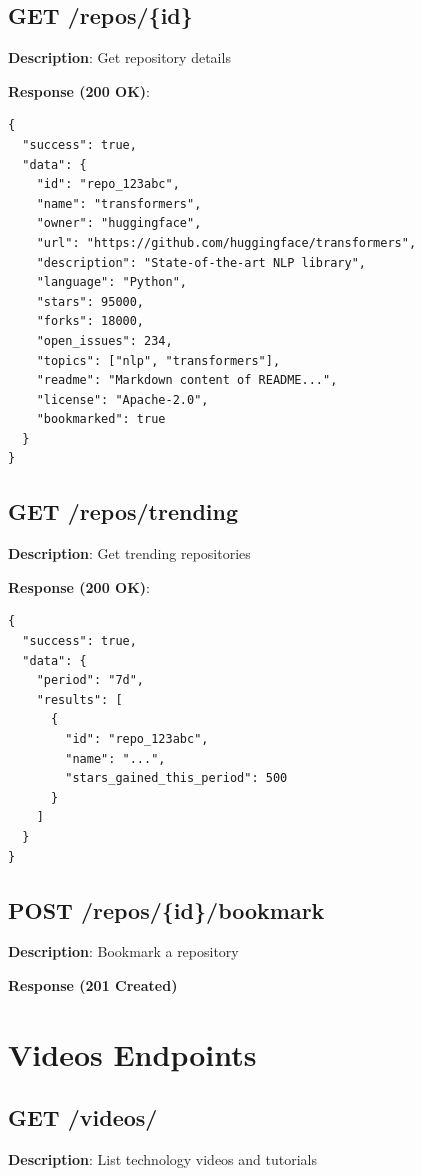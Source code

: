 \documentclass[12pt,a4paper]{report}
\begin{document}
\section{GET /repos/\{id\}}

\textbf{Description}: Get repository details

\textbf{Response (200 OK)}:
\begin{lstlisting}
{
  "success": true,
  "data": {
    "id": "repo_123abc",
    "name": "transformers",
    "owner": "huggingface",
    "url": "https://github.com/huggingface/transformers",
    "description": "State-of-the-art NLP library",
    "language": "Python",
    "stars": 95000,
    "forks": 18000,
    "open_issues": 234,
    "topics": ["nlp", "transformers"],
    "readme": "Markdown content of README...",
    "license": "Apache-2.0",
    "bookmarked": true
  }
}
\end{lstlisting}

\section{GET /repos/trending}

\textbf{Description}: Get trending repositories

\textbf{Response (200 OK)}:
\begin{lstlisting}
{
  "success": true,
  "data": {
    "period": "7d",
    "results": [
      {
        "id": "repo_123abc",
        "name": "...",
        "stars_gained_this_period": 500
      }
    ]
  }
}
\end{lstlisting}

\section{POST /repos/\{id\}/bookmark}

\textbf{Description}: Bookmark a repository

\textbf{Response (201 Created)}

\chapter{Videos Endpoints}

\section{GET /videos/}

\textbf{Description}: List technology videos and tutorials
\end{document}
